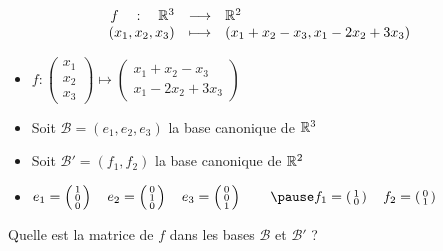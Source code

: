 \begin{frame}
\begin{exemple}
$$\begin{array}{rcl}
f \quad : \quad \mathbb{R}^3& \longrightarrow & \mathbb{R}^2\\
(x_1,x_2,x_3)&\longmapsto & (x_1+x_2-x_3, x_1-2x_2+3x_3)\\
\end{array}$$
\pause
\vspace*{-3ex}
\begin{itemize}
  \item $f  : \left(\begin{smallmatrix} x_1\\x_2\\x_3 \end{smallmatrix}\right) 
\mapsto \left(\begin{smallmatrix} x_1+x_2-x_3 \\ x_1-2x_2+3x_3 \end{smallmatrix}\right)$
\pause
  \item Soit $\mathcal{B} = (e_1,e_2,e_3)$ la base canonique de $\mathbb{R}^3$
\pause  
  \item Soit $\mathcal{B}' = (f_1,f_2)$ la base canonique de $\mathbb{R}^2$
\pause  
  \item $e_1 = \left(\begin{smallmatrix}1\\0\\0\end{smallmatrix}\right) \quad
e_2 = \left(\begin{smallmatrix}0\\1\\0\end{smallmatrix}\right) \quad
e_3 = \left(\begin{smallmatrix}0\\0\\1\end{smallmatrix}\right) \qquad
\pause
f_1 = \left(\begin{smallmatrix}1\\0\end{smallmatrix}\right) \quad
f_2 = \left(\begin{smallmatrix}0\\1\end{smallmatrix}\right)$
\end{itemize}
\pause
Quelle est la matrice de $f$ dans les bases $\mathcal{B}$ et $\mathcal{B}'$ ?
\vspace*{-1ex}
  \begin{itemize}

\end{itemize}
\end{exemple}
\end{frame}

